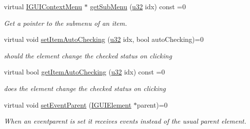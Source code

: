 \begin{DoxyCompactItemize}
virtual \hyperlink{classirr_1_1gui_1_1IGUIContextMenu}{I\+G\+U\+I\+Context\+Menu} $\ast$ \hyperlink{classirr_1_1gui_1_1IGUIContextMenu_a296cfd0c4944b2c0bfb88973401fb824}{get\+Sub\+Menu} (\hyperlink{namespaceirr_a0416a53257075833e7002efd0a18e804}{u32} idx) const =0
\begin{DoxyCompactList}\small\item\em Get a pointer to the submenu of an item. \end{DoxyCompactList}\item 
\mbox{\label{classirr_1_1gui_1_1IGUIContextMenu_ab393d00ca81ee9482c5a81d19cc6e79e}} 
virtual void \hyperlink{classirr_1_1gui_1_1IGUIContextMenu_ab393d00ca81ee9482c5a81d19cc6e79e}{set\+Item\+Auto\+Checking} (\hyperlink{namespaceirr_a0416a53257075833e7002efd0a18e804}{u32} idx, bool auto\+Checking)=0
\begin{DoxyCompactList}\small\item\em should the element change the checked status on clicking \end{DoxyCompactList}\item 
\mbox{\label{classirr_1_1gui_1_1IGUIContextMenu_ae1c7364f115e633bcfc040864e30f4c1}} 
virtual bool \hyperlink{classirr_1_1gui_1_1IGUIContextMenu_ae1c7364f115e633bcfc040864e30f4c1}{get\+Item\+Auto\+Checking} (\hyperlink{namespaceirr_a0416a53257075833e7002efd0a18e804}{u32} idx) const =0
\begin{DoxyCompactList}\small\item\em does the element change the checked status on clicking \end{DoxyCompactList}\item 
\mbox{\label{classirr_1_1gui_1_1IGUIContextMenu_a2d87831a224817fc9c9dd8f41c69ac0a}} 
virtual void \hyperlink{classirr_1_1gui_1_1IGUIContextMenu_a2d87831a224817fc9c9dd8f41c69ac0a}{set\+Event\+Parent} (\hyperlink{classirr_1_1gui_1_1IGUIElement}{I\+G\+U\+I\+Element} $\ast$parent)=0
\begin{DoxyCompactList}\small\item\em When an eventparent is set it receives events instead of the usual parent element. \end{DoxyCompactList}\item 
\mbox{\label{classirr_1_1gui_1_1IGUIContextMenu_ab7201b420431830aaaf8f9a0a831c859}} 

\end{DoxyCompactItemize}
